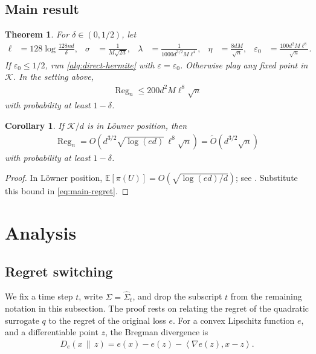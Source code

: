 \documentclass[11pt]{article}
\newtheorem{theorem}{Theorem}
\newtheorem{corollary}[corollary]{Corollary}
\newcommand{\E}{\mathbb E}
\newcommand{\K}{\mathcal K}
\newcommand{\1}{\mathbf 1}
\newcommand{\eps}{\varepsilon}
\newcommand{\ip}[2]{\left\langle #1,#2\right\rangle}
\begin{document}
\subsection{Main result}

\begin{theorem}
    \label{thm:main}
    For $\delta\in(0,1/2)$, let
    \begin{align}
        \ell    & =128\log\frac{128nd}{\delta},
                &
        \sigma  & =\frac1{M\sqrt{2d}},
                &
        \lambda & =\frac{1}{1000d^{3/2}M\ell^4},
                &
        \eta    & =\frac{8dM}{\sqrt n},
                &
        \eps_0  & =\frac{100d^2M\ell^8}{\sqrt n}.
        \label{eq:parameters-one}
        \label{eq:parameters-two}
    \end{align}
    If $\eps_0\leq1/2$, run \cref{alg:direct-hermite} with $\eps=\eps_0$.
    Otherwise play any fixed point in $\K$.  In the setting above,
    \begin{align}
        \operatorname{Reg}_n
        \leq 200d^2M\ell^8\sqrt n
        \label{eq:main-regret}
    \end{align}
    with probability at least $1-\delta$.
\end{theorem}

\begin{corollary}
    \label{cor:loewner}
    If $\K/d$ is in L\"owner position, then
    \begin{align}
        \operatorname{Reg}_n
        =O\!\left(
        d^{3/2}\sqrt{\log(ed)}\,\ell^8\sqrt n
        \right)
        =\widetilde O(d^{3/2}\sqrt n)
    \end{align}
    with probability at least $1-\delta$.
\end{corollary}

\begin{proof}
    In L\"owner position,
    $\E[\pi(U)]=O(\sqrt{\log(ed)/d})$; see
    \citet[Table~10.1(a)]{lattimore2026bandit}.  Substitute this bound in
    \eqref{eq:main-regret}.
\end{proof}

\section{Analysis}
\label{sec:analysis}
\subsection{Regret switching}
We fix a time step $t$, write $\Sigma=\widehat\Sigma_t$, and drop the subscript $t$ from the remaining notation in this subsection.
The proof rests on relating the regret of the quadratic surrogate $q$ to the regret of the original loss $e$.
For a convex Lipschitz function $e$, and a differentiable point $z$, the Bregman divergence is
\begin{align}
    D_e(x\,\|\,z)
    =e(x)-e(z)-\ip{\nabla e(z)}{x-z}.
    \label{eq:bregman}
\end{align}
\end{document}

